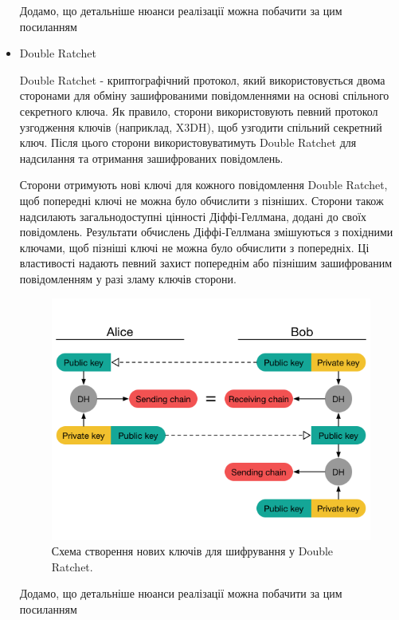 \begin{itemize}
        Додамо, що детальніше нюанси реалізації можна побачити за цим посиланням \cite{kret2023pqxdh}
    
    \item Double Ratchet 

        Double Ratchet - криптографічний протокол, який використовується двома сторонами для обміну зашифрованими повідомленнями на основі спільного секретного ключа. Як правило, сторони використовують певний протокол узгодження ключів (наприклад, X3DH), щоб узгодити спільний секретний ключ. Після цього сторони використовуватимуть Double Ratchet для надсилання та отримання зашифрованих повідомлень.

        Сторони отримують нові ключі для кожного повідомлення Double Ratchet, щоб попередні ключі не можна було обчислити з пізніших. Сторони також надсилають загальнодоступні цінності Діффі-Геллмана, додані до своїх повідомлень. Результати обчислень Діффі-Геллмана змішуються з похідними ключами, щоб пізніші ключі не можна було обчислити з попередніх. Ці властивості надають певний захист попереднім або пізнішим зашифрованим повідомленням у разі зламу ключів сторони.

        \begin{figure}[ht!]
            \centering
            \includegraphics[scale=0.5]{../IMAGES/signal_double_ratchet1.png}
            \caption{Схема створення нових ключів для шифрування у Double Ratchet.}
            \label{signal_double_ratchet1}
        \end{figure}
    
        Додамо, що детальніше нюанси реалізації можна побачити за цим посиланням \cite{perrin2016doubleratchet}
    

\end{itemize}
